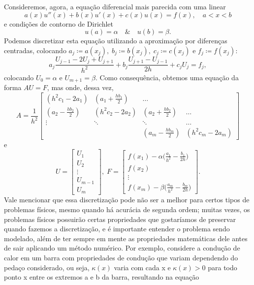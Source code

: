 \documentclass[../differential_methods.tex]{subfiles}
\begin{document}
Consideremos, agora, a equação diferencial mais parecida com uma linear
\[
	a(x)u''(x) + b(x)u'(x)+c(x)u(x)=f(x),\quad a < x < b
\]
e condições de contorno de Dirichlet
\[
	u(a)=\alpha \quad\&\quad u(b)=\beta .
\]
Podemos discretizar esta equação utilizando a aproximação por diferenças centradas, colocando \(a_{j}\coloneqq a(x_{j}),\; b_{j}\coloneqq b(x_{j}),\; c_{j}\coloneqq c(x_{j})\) e \(f_{j} \coloneqq f(x_{j})\):
\[
	a_{j}\frac{U_{j-1}-2U_{j}+U_{j+1}}{h^{2}} + b_{j}\frac{U_{j+1}-U_{j-1}}{2h}+c_{j}U_{j}=f_{j},
\]
colocando \(U_{0}=\alpha \) e \(U_{m+1}=\beta \). Como consequência, obtemos uma equação da forma \(AU=F\), mas onde, dessa vez,
\[
	A = \frac{1}{h^{2}}\begin{bmatrix}
		(h^{2}c_{1}-2a_{1})      & (a_1+\frac{hb_1}{2}) & \dotsc                    &                     \\
		(a_{2}-\frac{hb_{2}}{2}) & (h^{2}c_{2}-2a_{2})  & (a_{2}+\frac{hb_2}{2})    & \dotsc              \\
		\vdots                   & \ddots               & \ddots                    & \dotsc              \\
		                         &                      & (a_{m}- \frac{hb_{m}}{2}) & (h^{2}c_{m}-2a_{m})
	\end{bmatrix}
\]
e
\[
	U = \begin{bmatrix}
		U_1     \\
		U_2     \\
		\vdots  \\
		U_{m-1} \\
		U_{m}
	\end{bmatrix},\; F = \begin{bmatrix}
		f(x_1)-\alpha \bigl(\frac{a_1}{h^{2}} - \frac{b_1}{2h}\bigr) \\
		f(x_2)                                                       \\
		\vdots                                                       \\
		f(x_m)-\beta \bigl(\frac{a_m}{h^{2}} - \frac{b_m}{2h}\bigr)
	\end{bmatrix}.
\]
Vale mencionar que essa discretização pode não ser a melhor para certos tipos de problemas físicos, mesmo quando há acurácia de segunda ordem; muitas vezes, os problemas físicos possuirão certas propriedades que gostaríamos de preservar quando fazemos a discretização, e é importante entender o problema sendo modelado, além de ter sempre em mente as propriedades matemáticas dele antes de sair aplicando um método numérico.
Por exemplo, considere a condução de calor em um barra com propriedades de condução que variam dependendo do pedaço considerado, ou seja, \(\kappa (x)\) varia com cada x e \(\kappa (x)>0\) para todo ponto x entre os extremos a e b da barra, resultando na equação
\end{document}
